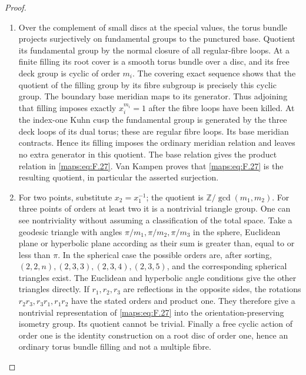 \begin{proof}
\begin{enumerate}[label=\arabic*.]
\item Over the complement of small discs at the special values,
the torus bundle projects surjectively on fundamental groups
to the punctured base.  Quotient its fundamental group by the
normal closure of all regular-fibre loops.  At a finite
filling its root cover is a smooth torus bundle over a disc,
and its free deck group is cyclic of order $m_i$.
The covering exact sequence shows that the quotient of the
filling group by its fibre subgroup is precisely this cyclic
group.  The boundary base meridian maps to its generator.
Thus adjoining that filling imposes exactly
$x_i^{m_i}=1$ after the fibre loops have been killed.
At the index-one Kuhn cusp the fundamental group is generated
by the three deck loops of its dual torus; these are regular
fibre loops.  Its base meridian contracts.  Hence its filling
imposes the ordinary meridian relation and leaves no extra
generator in this quotient.  The base relation gives the
product relation in \eqref{maps:eq:F.27}.  Van Kampen proves that \eqref{maps:eq:F.27} is
the resulting quotient, in particular the asserted surjection.

\item For two points, substitute $x_2=x_1^{-1}$; the quotient is
$\mathbb Z/\gcd(m_1,m_2)$.
For three points of orders at least two it is a nontrivial
triangle group.  One can see nontriviality without assuming
a classification of the total space.  Take a geodesic triangle
with angles $\pi/m_1,\pi/m_2,\pi/m_3$ in the sphere, Euclidean
plane or hyperbolic plane according as their sum is greater
than, equal to or less than $\pi$.
In the spherical case the possible orders are, after sorting,
$(2,2,n),(2,3,3),(2,3,4),(2,3,5)$, and the corresponding
spherical triangles exist.  The Euclidean and hyperbolic
angle conditions give the other triangles directly.
If $r_1,r_2,r_3$ are reflections in the opposite sides,
the rotations $r_2r_3,r_3r_1,r_1r_2$ have the stated
orders and product one.  They therefore give a nontrivial
representation of \eqref{maps:eq:F.27} into the orientation-preserving
isometry group.  Its quotient cannot be trivial.
Finally a free cyclic action of order one is the identity
construction on a root disc of order one, hence an ordinary
torus bundle filling and not a multiple fibre.

\end{enumerate}
\end{proof}




